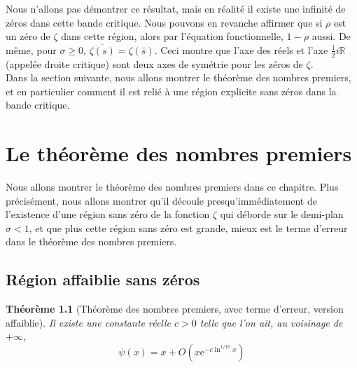 \documentclass[french]{report}
\newtheorem{theorem}{Théorème}[section]
\begin{document}
Nous n'allons pas démontrer ce résultat, mais en réalité il existe une infinité de zéros dans cette bande critique. Nous pouvons en revanche affirmer que si $\rho$ est un zéro de $\zeta$ dans cette région, alors par l'équation fonctionnelle, $1-\rho$ aussi. De même, pour $\sigma\geq0$, $\overline{\zeta(s)}=\zeta(\bar{s})$. Ceci montre que l'axe des réels et l'axe $\frac{1}{2}i\mathbb{R}$ (appelée droite critique) sont deux axes de symétrie pour les zéros de $\zeta$.
\\

Dans la section suivante, nous allons montrer le théorème des nombres premiers, et en particulier comment il est relié à une région explicite sans zéros dans la bande critique.

\chapter{Le théorème des nombres premiers}

Nous allons montrer le théorème des nombres premiers dans ce chapitre. Plus précisément, nous allons montrer qu'il découle presqu'immédiatement de l'existence d'une région sans zéro de la fonction $\zeta$ qui déborde sur le demi-plan $\sigma<1$, et que plus cette région sans zéro est grande, mieux est le terme d'erreur dans le théorème des nombres premiers.

\section{Région affaiblie sans zéros}\label{section:region-affaiblie}

\begin{theorem}[Théorème des nombres premiers, avec terme d'erreur, version affaiblie]\label{eq:tnp-erreur-1}
  Il existe une constante réelle $c>0$ telle que l'on ait, au voisinage de $+\infty$,
  \begin{equation}
    \psi(x)=x+O(x\mathrm{e}^{-c\ln^{1/10} x})
  \end{equation}
\end{theorem}
\end{document}
